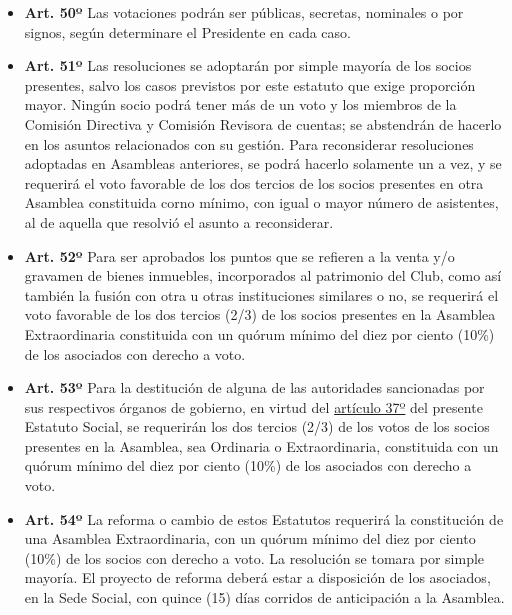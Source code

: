 \documentclass[]{book}
\providecommand{\tightlist}{%
  \setlength{\itemsep}{0pt}\setlength{\parskip}{0pt}}
\begin{document}
\begin{itemize}
\tightlist
\item
  \textbf{Art. 50º} Las votaciones podrán ser públicas, secretas,
  nominales o por signos, según determinare el Presidente en cada caso.
\end{itemize}

\begin{itemize}
\tightlist
\item
  \textbf{Art. 51º} Las resoluciones se adoptarán por simple mayoría de
  los socios presentes, salvo los casos previstos por este estatuto que
  exige proporción mayor. Ningún socio podrá tener más de un voto y los
  miembros de la Comisión Directiva y Comisión Revisora de cuentas; se
  abstendrán de hacerlo en los asuntos relacionados con su gestión. Para
  reconsiderar resoluciones adoptadas en Asambleas anteriores, se podrá
  hacerlo solamente un a vez, y se requerirá el voto favorable de los
  dos tercios de los socios presentes en otra Asamblea constituida corno
  mínimo, con igual o mayor número de asistentes, al de aquella que
  resolvió el asunto a reconsiderar.
\end{itemize}

\begin{itemize}
\tightlist
\item
  \textbf{Art. 52º} Para ser aprobados los puntos que se refieren a la
  venta y/o gravamen de bienes inmuebles, incorporados al patrimonio del
  Club, como así también la fusión con otra u otras instituciones
  similares o no, se requerirá el voto favorable de los dos tercios
  (2/3) de los socios presentes en la Asamblea Extraordinaria
  constituida con un quórum mínimo del diez por ciento (10\%) de los
  asociados con derecho a voto.
\end{itemize}

\begin{itemize}
\tightlist
\item
  \textbf{Art. 53º} Para la destitución de alguna de las autoridades
  sancionadas por sus respectivos órganos de gobierno, en virtud del
  \protect\hyperlink{art37}{artículo 37º} del presente Estatuto Social,
  se requerirán los dos tercios (2/3) de los votos de los socios
  presentes en la Asamblea, sea Ordinaria o Extraordinaria, constituida
  con un quórum mínimo del diez por ciento (10\%) de los asociados con
  derecho a voto.
\end{itemize}

\begin{itemize}
\tightlist
\item
  \textbf{Art. 54º} La reforma o cambio de estos Estatutos requerirá la
  constitución de una Asamblea Extraordinaria, con un quórum mínimo del
  diez por ciento (10\%) de los socios con derecho a voto. La resolución
  se tomara por simple mayoría. El proyecto de reforma deberá estar a
  disposición de los asociados, en la Sede Social, con quince (15) días
  corridos de anticipación a la Asamblea.
\end{itemize}
\end{document}

